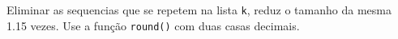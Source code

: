 \documentclass[12pt,varwidth=16cm,border=1pt]{standalone}
\begin{document}
Eliminar as sequencias que se repetem na lista \verb+k+, reduz o tamanho da mesma 1.15 vezes. Use a função \verb+round()+ com duas casas decimais.

\questiomtrue
\end{document}
